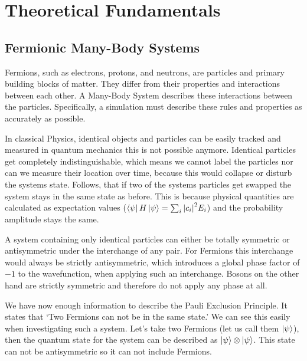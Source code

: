 \chapter{Theoretical Fundamentals}
\label{c:fundamentals}


\section{Fermionic Many-Body Systems}\label{sec:fermionic-many-body-systems}
Fermions, such as electrons, protons, and neutrons, are particles and primary building blocks of matter.
They differ from their properties and interactions between each other.
A Many-Body System describes these interactions between the particles.
Specifically, a simulation must describe these rules and properties as accurately as possible.
\cite[chapter 6.1]{benito_kottmann_qc_2025}

In classical Physics, identical objects and particles can be easily tracked and measured in quantum mechanics this is not possible anymore.
Identical particles get completely indistinguishable, which means we cannot label the particles nor can we measure their location over time, because this would collapse or disturb the systems state.
Follows, that if two of the systems particles get swapped the system stays in the same state as before.
This is because physical quantities are calculated as expectation values ($\bra{\psi} H \ket{\psi} = \sum_{i}{\abs{c_i}^2} E_i$) and the probability amplitude stays the same.
\cite[chapter 7.1]{sakurai2020modern}\cite[chapter 6.1]{benito_kottmann_qc_2025}


A system containing only identical particles can either be totally symmetric or antisymmetric under the interchange of any pair.
For Fermions this interchange would always be strictly antisymmetric, which introduces a global phase factor of $-1$ to the wavefunction, when applying such an interchange.
Bosons on the other hand are strictly symmetric and therefore do not apply any phase at all.
\cite[chapter 7.2]{sakurai2020modern}~\cite[chapter 6.1]{benito_kottmann_qc_2025}

We have now enough information to describe the Pauli Exclusion Principle.
It states that `Two Fermions can not be in the same state.'
We can see this easily when investigating such a system.
Let's take two Fermions (let us call them $\ket{\psi}$), then the quantum state for the system can be described as $\ket{\psi} \otimes \ket{\psi}$.
This state can not be antisymmetric so it can not include Fermions.
\cite[chapter 7.1, 7.2]{sakurai2020modern}~\cite[chapter 6.1]{benito_kottmann_qc_2025}

